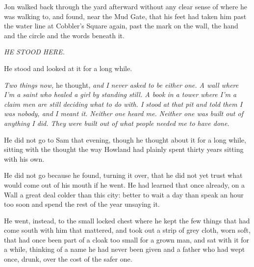 \sceneBreak

Jon walked back through the yard afterward without any clear sense of where he was walking to, and found, near the Mud Gate, that his feet had taken him past the water line at Cobbler’s Square again, past the mark on the wall, the hand and the circle and the words beneath it.

\textit{HE STOOD HERE.}

He stood and looked at it for a long while.

\textit{Two things now,} he thought, \textit{and I never asked to be either one. A wall where I’m a saint who healed a girl by standing still. A book in a tower where I’m a claim men are still deciding what to do with. I stood at that pit and told them I was nobody, and I meant it. Neither one heard me. Neither one was built out of anything I did. They were built out of what people needed me to have done.}

He did not go to Sam that evening, though he thought about it for a long while, sitting with the thought the way Howland had plainly spent thirty years sitting with his own.

He did not go because he found, turning it over, that he did not yet trust what would come out of his mouth if he went. He had learned that once already, on a Wall a great deal colder than this city: better to wait a day than speak an hour too soon and spend the rest of the year unsaying it.

He went, instead, to the small locked chest where he kept the few things that had come south with him that mattered, and took out a strip of grey cloth, worn soft, that had once been part of a cloak too small for a grown man, and sat with it for a while, thinking of a name he had never been given and a father who had wept once, drunk, over the cost of the safer one.